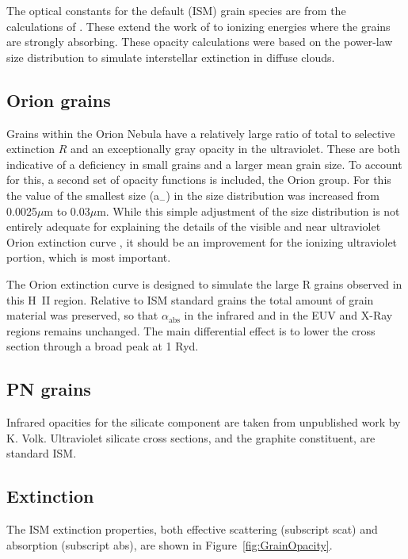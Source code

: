 The optical constants for the default (ISM) grain species are from the
calculations of \citep{Martin1990}.  These extend the work of
\citep{Draine1984} to ionizing energies where the grains are strongly absorbing.
These opacity calculations were based on the
\citep{Mathis1977} power-law size distribution to simulate interstellar extinction in
diffuse clouds.

\subsection{Orion grains}

Grains within the Orion Nebula have a relatively large ratio of total
to selective extinction $R$ and an exceptionally gray opacity in the
ultraviolet.  These are both indicative of a deficiency in small grains
and a larger mean grain size.  To account for this, a second set of opacity
functions is included, the Orion group.  For this the value of the smallest
size (a$_-$) in the \citep{Mathis1977} size distribution was increased from
0.0025$\mu$m to 0.03$\mu$m.  While this simple adjustment of the size distribution
is not entirely adequate for explaining the details of the visible and near
ultraviolet Orion extinction curve \citep{Mathis1981}, it should
be an improvement for the ionizing ultraviolet portion, which is most
important.

The Orion extinction curve is designed to simulate the large R grains
observed in this H~II region.  Relative to ISM standard grains the total
amount of grain material was preserved, so that $\alpha_{\mathrm{abs}}$ in the infrared and
in the EUV and X-Ray regions remains unchanged.  The main differential effect
is to lower the cross section through a broad peak at 1 Ryd.

\subsection{PN grains}

Infrared opacities for the silicate component are taken from unpublished
work by K. Volk.  Ultraviolet silicate cross sections, and the graphite
constituent, are standard ISM.

\subsection{Extinction}

The ISM extinction properties, both effective scattering (subscript scat)
and absorption (subscript abs), are shown in Figure~\ref{fig:GrainOpacity}.

